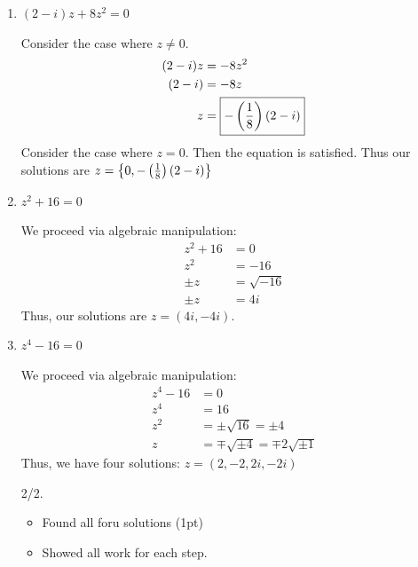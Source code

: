 \begin{enumerate}
\begin{enumerate}
        \item $(2-i)z +8z^2 =0$
        
        \begin{problem}
            Consider the case where $z \ne 0$. 
            \begin{align*}
                (2-i)z &= -8z^2\\
                (2-i) &= -8z\\
                z &= \boxed{-\left(\frac{1}8\right)(2-i)}
            \end{align*}
            Consider the case where $z = 0$. Then the equation is satisfied. \gline{}
            Thus our solutions are $z = \left\{0, -\left(\frac{1}8\right)(2-i)\right\}$
        \end{problem}
        




        \item $z^2 +16 =0$
        
        \begin{problem}
            We proceed via algebraic manipulation:
            \begin{align*}
                z^2 + 16&= 0\\
                z^2 &= -16\\
                \pm z &= \sqrt{-16}\\
                \pm z &= 4i
            \end{align*}
            Thus, our solutions are $z = (4i, -4i)$. 
        \end{problem}
        



        \item $z^4 -16 =0$
        
        \begin{problem}
            We proceed via algebraic manipulation:
            \begin{align*}
                z^4 - 16 &= 0\\
                z^4 &= 16\\
                z^2 &= \pm \sqrt{16} = \pm 4\\
                z &= \mp \sqrt{\pm 4} = \mp 2 \sqrt{\pm 1}
            \end{align*}
            Thus, we have four solutions: $z = (2, -2, 2i, -2i)$
        \end{problem}
        \begin{grade}
            2/2.
            \begin{itemize}[itemsep=0pt, parsep=0pt]
                \item Found all foru solutions (1pt)
                \item Showed all work for each step. 
            \end{itemize}
        \end{grade}
    \end{enumerate}


\end{enumerate}
